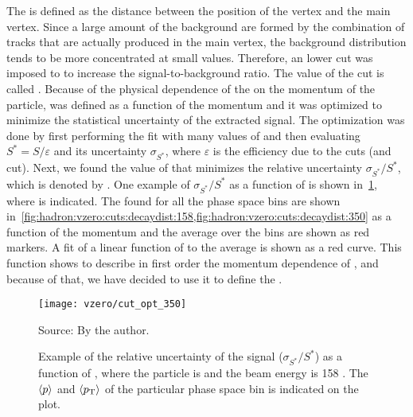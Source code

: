 The \decaydist is defined as the distance between the position
of the \vzero vertex and the main vertex.
Since a large amount of the background \vzeros
are formed by the combination of tracks that are actually
produced in the main vertex, the background \decaydist
distribution tends to be more concentrated at small values.
Therefore, an lower cut was imposed to \decaydist to increase
the signal-to-background ratio. The value of the cut is called
\decaydistmin.
Because of the physical dependence of the \decaydist on
the momentum of the particle, \decaydistmin was defined
as a function of the \vzero momentum and it was optimized to minimize
the statistical uncertainty of the extracted signal.
The optimization was done by first performing the \minv fit
with many values of \decaydistmin and then evaluating
$S^* = S/\varepsilon$ and its uncertainty $\sigma_{S^*}$,
where $\varepsilon$ is the efficiency due to the \vzero cuts
(\impact and \decaydist cut).
Next, we found the value of \decaydistmin that minimizes the
relative uncertainty $\sigma_{S^*}/S^*$, which is denoted by \decaydistopt.
One example of $\sigma_{S^*}/S^*$ as a function of \decaydistmin is
shown in~\cref{fig:hadron:vzero:cuts:decaydist:example}, where \decaydistopt is indicated.
The \decaydistopt found for all the phase space bins
are shown in~\cref{fig:hadron:vzero:cuts:decaydist:158,fig:hadron:vzero:cuts:decaydist:350}
as a function of the \vzero momentum and 
the average over the \pT bins are shown as red markers.
A fit of a linear function of \logp to the average \decaydistopt
is shown as a red curve. This function shows to describe
in first order the momentum dependence of \decaydistopt,
and because of that, we have decided to use it to define the \decaydistmin.

\begin{figure}
  \centering
  \texttt{[image: vzero/cut\_opt\_350]}
  \caption{Example of the relative uncertainty of the signal ($\sigma_{S^*}/S^*$)
    as a function of \decaydistmin, where the \vzero particle is \lamb
    and the beam energy is 158 \GeV. The $\langle p\rangle$ and $\langle p_\text{T}\rangle$
    of the particular phase space bin is indicated on the plot.}
  \label{fig:hadron:vzero:cuts:decaydist:example}
  \begin{center}
    \small Source: By the author. 
  \end{center}
\end{figure}


